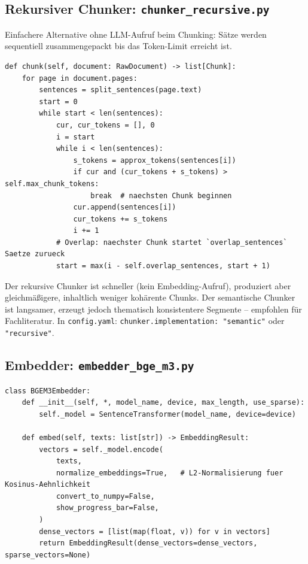 \documentclass[12pt, a4paper]{article}
\begin{document}
\subsection{Rekursiver Chunker: \texttt{chunker\_recursive.py}}

Einfachere Alternative ohne LLM-Aufruf beim Chunking: Sätze werden sequentiell
zusammengepackt bis das Token-Limit erreicht ist.

\begin{lstlisting}[style=pythonstyle, caption={Regelbasierter Chunker}]
def chunk(self, document: RawDocument) -> list[Chunk]:
    for page in document.pages:
        sentences = split_sentences(page.text)
        start = 0
        while start < len(sentences):
            cur, cur_tokens = [], 0
            i = start
            while i < len(sentences):
                s_tokens = approx_tokens(sentences[i])
                if cur and (cur_tokens + s_tokens) > self.max_chunk_tokens:
                    break  # naechsten Chunk beginnen
                cur.append(sentences[i])
                cur_tokens += s_tokens
                i += 1
            # Overlap: naechster Chunk startet `overlap_sentences` Saetze zurueck
            start = max(i - self.overlap_sentences, start + 1)
\end{lstlisting}

\begin{infobox}
Der rekursive Chunker ist schneller (kein Embedding-Aufruf), produziert aber gleichmäßigere,
inhaltlich weniger kohärente Chunks. Der semantische Chunker ist langsamer, erzeugt
jedoch thematisch konsistentere Segmente -- empfohlen für Fachliteratur.
In \texttt{config.yaml}: \texttt{chunker.implementation: "semantic"} oder \texttt{"recursive"}.
\end{infobox}

\subsection{Embedder: \texttt{embedder\_bge\_m3.py}}

\begin{lstlisting}[style=pythonstyle, caption={BGE-M3 Embedding-Wrapper}]
class BGEM3Embedder:
    def __init__(self, *, model_name, device, max_length, use_sparse):
        self._model = SentenceTransformer(model_name, device=device)

    def embed(self, texts: list[str]) -> EmbeddingResult:
        vectors = self._model.encode(
            texts,
            normalize_embeddings=True,   # L2-Normalisierung fuer Kosinus-Aehnlichkeit
            convert_to_numpy=False,
            show_progress_bar=False,
        )
        dense_vectors = [list(map(float, v)) for v in vectors]
        return EmbeddingResult(dense_vectors=dense_vectors, sparse_vectors=None)
\end{lstlisting}
\end{document}
